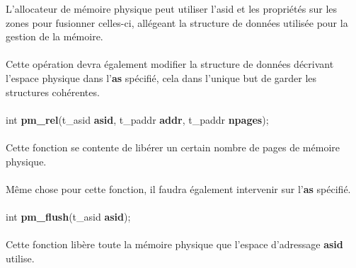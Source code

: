 \documentclass[10pt,a4wide]{article}
\begin{document}
L'allocateur de m\'emoire physique peut utiliser l'asid et les
propri\'et\'es sur les zones pour fusionner celles-ci, all\'egeant
la structure de donn\'ees utilis\'ee pour la gestion de la m\'emoire.

\paragraph{}

Cette op\'eration devra \'egalement modifier la structure de donn\'ees
d\'ecrivant l'espace physique dans l'\textbf{as} sp\'ecifi\'e, cela
dans l'unique but de garder les structures coh\'erentes.

\paragraph{}

\hspace{1.5cm}int \textbf{pm\_rel}(t\_asid \textbf{asid},
                                   t\_paddr \textbf{addr},
                                   t\_paddr \textbf{npages});

\paragraph{}

Cette fonction se contente de lib\'erer un certain nombre
de pages de m\'emoire physique.

\paragraph{}

M\^eme chose pour cette fonction, il faudra \'egalement intervenir sur
l'\textbf{as} sp\'ecifi\'e.

\paragraph{}

\hspace{1.5cm}int \textbf{pm\_flush}(t\_asid \textbf{asid});

\paragraph{}

Cette fonction lib\`ere toute la m\'emoire physique que l'espace d'adressage
\textbf{asid} utilise.

\paragraph{}
\end{document}
